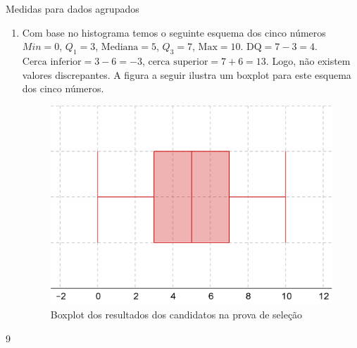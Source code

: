 \begin{answer}{Medidas para dados agrupados}
{\begin{enumerate}
O mesmo raciocínio utilizado para obter a mediana, pode ser usado para obter aproximações do primeiro e terceiro quartis. Em vez de $50\%$ na frequência acumulada, deveremos encontrar $25\%$ e $75\%$, respectivamente. Como a frequência do primeiro intervalo é $0{,}15$ e a frequência acumulada, considerando os dois primeiros intervalos é $0{,}15+0{,}25=0{,}40$, seque que o primeiro quartil deve estar no segundo intervalo delimitado por $2$ e $4$. Logo, tomamos o ponto médio deste intervalo como uma aproximação para o primeiro quartil, a saber, 3. Até o terceiro intervalo a frequência acumumulada é $0{,}6$, considerando o quarto intervalo, a frequência acumulada é $0{,}9$. Logo, como o terceiro quartil está no quarto intervalo, tomamos o ponto médio $7$ com aproximação para o terceiro quartil.

\item Com base no histograma temos o seguinte esquema dos cinco números $Min=0$, $Q_1=3$, $\text{Mediana}=5$, $Q_3=7$, $\text{Max}=10$. $\text{DQ}=7-3=4$. $\text{Cerca inferior}=3-6=-3$, $\text{cerca superior}=7+6=13$. Logo, não existem valores discrepantes. A figura a seguir ilustra um boxplot para este esquema dos cinco números.
\begin{figure}[H]
\centering

\includegraphics[width=.5\linewidth]{boxplotexercicio9.png}
\caption{Boxplot dos resultados dos candidatos na prova de seleção}
\label{}
\end{figure}
\end{enumerate}
}{9}
\end{answer}
\label{\detokenize{PE104-A:ativ-dadosagrupados}}
